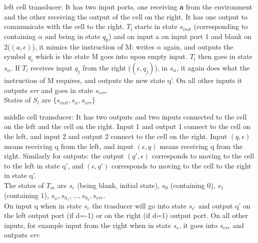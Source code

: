 \documentclass{beamer}
\begin{document}
\begin{frame} 

\begin{block}{left cell transducer:} It has two input ports, one receiving \textbf{a} from the environment and the other receiving the output of the cell on the right. It has one output to communicate with the cell to the right. $T_{l}$ starts in state $s_{init}$ (corresponding to containing $\alpha$ and being in state $q_{0}$) and on input a on input port 1 and blank on 2($(a,\epsilon)$), it mimics the instruction of M: writes $\alpha$ again, and outputs the symbol $q_{i}$ which is the state M goes into upon empty input. $T_{l}$ then goes in state $s_{\alpha}$. If $T_{l}$ receives input $q_{j}$ from the right ($(\epsilon,q_{j})$), in $s_{\alpha}$, it again does what the instruction of M requires, and outputs the new state q'. On all other inputs it outputs \textit{err} and goes in state $s_{err}$.\\
States of $S_{l}$ are $\{ s_{init},s_{\alpha},s_{err} \} $
\end{block}
\end{frame}
\begin{frame}
\begin{block}{middle cell transducer:} It has two outputs and two inputs connected to the cell on the left and the cell on the right. Input 1 and output 1 connect to the cell on the left, and input 2 and output 2 connect to the cell on the right. Input $(q, \epsilon)$ means receiving q from the left, and input $(\epsilon, q)$ means receiving q from the right. Similarly for outputs: the output $(q', \epsilon)$ corresponds to moving to the cell to the left in state q', and $(\epsilon, q')$ corresponds to moving to the cell to the right in state q'. \\
The states of $T_{m}$ are $s_{\epsilon}$ (being blank, initial state), $s_{0}$ (containing 0), $s_{1}$ (containing 1), $s_{\omega}, s_{h_{1}},...,s_{h_{t}}, s_{err}$. \\
On input q when in state $s_{c}$ the trasducer will go into state $s_{c'}$ and output q' on the left output port (if d=-1) or on the right (if d=1) output port. On all other inputs, for example input from the right when in state $s_{\epsilon}$, it goes into $s_{err}$ and outputs \textit{err}.

\end{block}
\end{frame}
\end{document}
